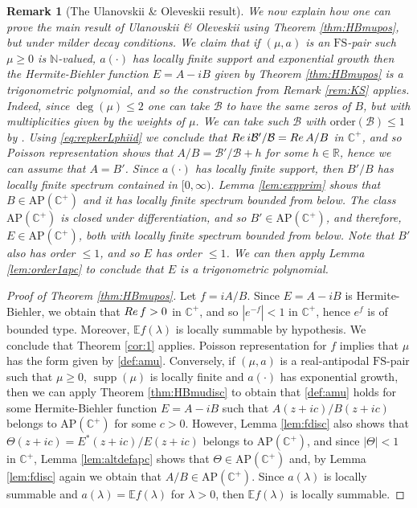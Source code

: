 \documentclass[a4paper,reqno,12pt]{amsart}
\DeclareMathOperator{\supp}{\mathrm{supp}}
\newtheorem{remark}{Remark}
\newcommand{\B}{\mathcal{B}}
\newcommand{\E}{\mathcal{E}}
\renewcommand{\H}{\mathbb{C}^+}
\newcommand{\n}{\mathbb{N}}
\renewcommand{\r}{\mathbb{R}}
\newcommand{\re}{{\rm Re}\,}
\newcommand{\la}{\lambda}
\newcommand{\1}{{\bf 1}}
\newcommand{\apc}{\mathrm{AP}(\H)}
\newcommand{\fs}{\mathrm{FS}}
\renewcommand{\E}{\mathbb{E}}
\renewcommand{\1}{{\bo 1}}
\renewcommand{\a}{a(\cdot)}
\begin{document}
\begin{remark}[The Ulanovskii \& Oleveskii result] \label{rem:OU}
We now explain how one can prove the main result of Ulanovskii \& Oleveskii \cite{OU} using Theorem \ref{thm:HBmupos}, but under milder decay conditions. We claim that if $(\mu,a)$ is an $\fs$-pair such $\mu\geq 0$ is $\n$-valued, $\a$ has locally finite support and exponential growth then the Hermite-Biehler function $E=A-iB$ given by Theorem \ref{thm:HBmupos} is a trigonometric polynomial, and so the construction from Remark \ref{rem:KS} applies. Indeed, since $\deg(\mu)\leq 2$ one can take $\B$ to have the same zeros of $B$, but with multiplicities given by the weights of $\mu$. We can take such $\B$ with $\text{order}(\B)\leq 1$ by \cite[Thm. 6, p. 16]{L}. Using \eqref{eq:repkerLphiid} we conclude that $\re i\B'/\B=\re A/B$ in $\H$, and so Poisson representation shows that $A/B = \B'/\B + h$ for some $h\in \r$, hence we can assume that $A=B'$. Since $\a$ has locally finite support, then $B'/B$ has locally finite spectrum contained in $[0,\infty)$. Lemma \ref{lem:expprim} shows that $B\in \apc$ and it has locally finite spectrum bounded from below. The class $\apc$ is closed under differentiation, and so $B'\in \apc$, and therefore, $E\in \apc$, both with locally finite spectrum bounded from below. Note that $B'$ also has order $\leq 1$, and so $E$ has order $\leq 1$. We can then apply Lemma \ref{lem:order1apc} to conclude that $E$ is a trigonometric polynomial.
\end{remark}

\begin{proof}[Proof of Theorem \ref{thm:HBmupos}]
Let $f=iA/B$. Since $E=A-iB$ is Hermite-Biehler, we obtain that $\re f >0$ in $\H$, and so $|e^{-f}|<1$ in $\H$, hence $e^{f}$ is of bounded type. Moreover, $\E f(\la)$ is locally summable by hypothesis. We conclude that Theorem \ref{cor:1} applies. Poisson representation \cite[Thm. 4 \& Prob. 89]{dB} for $f$ implies that $\mu$ has the form given by \eqref{def:amu}. Conversely, if $(\mu,a)$ is a real-antipodal $\fs$-pair such that $\mu\geq 0$, $\supp(\mu)$ is locally finite and $\a$ has exponential growth, then we can apply Theorem \ref{thm:HBmudisc} to obtain that \eqref{def:amu} holds for some Hermite-Biehler function $E=A-iB$ such that $A(z+ic)/B(z+ic)$ belongs to $\apc$ for some $c>0$. However, Lemma \ref{lem:fdisc} also shows that $\Theta(z+ic)=E^*(z+ic)/E(z+ic)$ belongs to $\apc$, and since $|\Theta|<1$ in $\H$, Lemma \ref{lem:altdefapc} shows that $\Theta\in \apc$ and, by Lemma \ref{lem:fdisc} again we obtain that $A/B\in \apc$.  Since $a(\la)$ is locally summable and $a(\la)=\E f(\la)$ for $\la>0$, then $\E f(\la)$ is locally summable.
\end{proof}
\end{document}
